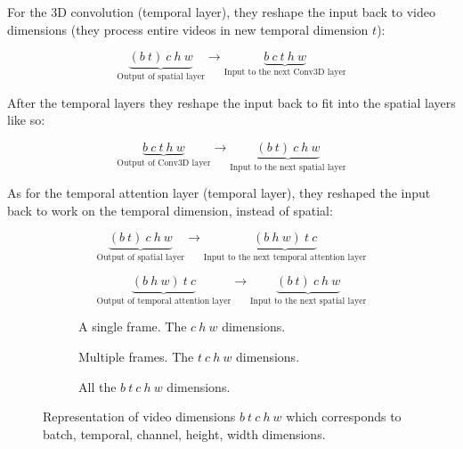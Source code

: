 For the 3D convolution (temporal layer), they reshape the input back to video dimensions (they process entire videos in new temporal dimension $t$): 

\[ \underbrace{(b\ t)\ c\ h\ w}_{\text{Output of spatial layer}} \rightarrow \underbrace{b\ c\ t\ h\ w}_{\text{Input to the next Conv3D layer}} \]

After the temporal layers they reshape the input back to fit into the spatial layers like so:

\[ \underbrace{b\ c\ t\ h\ w}_{\text{Output of Conv3D layer}} \rightarrow \underbrace{(b\ t)\ c\ h\ w}_{\text{Input to the next spatial layer}} \]

As for the temporal attention layer (temporal layer), they reshaped the input back to work on the temporal dimension, instead of spatial:

\[ \underbrace{(b\ t)\ c\ h\ w}_{\text{Output of spatial layer}} \rightarrow \underbrace{(b\ h\ w) \ t\ c}_{\text{Input to the next temporal attention layer}} \]

\[ \underbrace{(b\ h\ w) \ t\ c}_{\text{Output of temporal attention layer}} \rightarrow \underbrace{(b\ t)\ c\ h\ w}_{\text{Input to the next spatial layer}} \]

\begin{figure}
    \centering

    \begin{subfigure}{0.3\textwidth}
        \centering
        \scalebox{0.5}{
            
        }
        \caption{A single frame. The $c\ h\ w$ dimensions.}
    \end{subfigure}

    \begin{subfigure}{0.3\textwidth}
        \centering
        \scalebox{0.5}{
            
        }
        \caption{Multiple frames. The $t\ c\ h\ w$ dimensions.}
    \end{subfigure}

    \begin{subfigure}{0.7\textwidth}
        \centering
        \scalebox{0.5}{
            
        }
        \caption{All the $b\ t\ c\ h\ w$ dimensions.}
    \end{subfigure}

    \caption{Representation of video dimensions $b\ t\ c\ h\ w$ which corresponds to batch, temporal, channel, height, width dimensions.}
    \label{fig:video_ldm_dimensions}
\end{figure}

